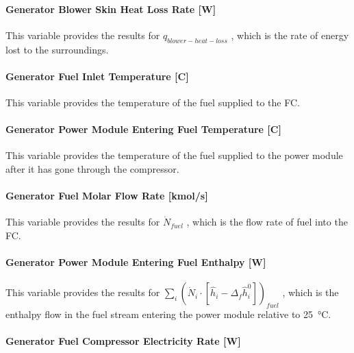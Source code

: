 \paragraph{Generator Blower Skin Heat Loss Rate {[}W{]}}\label{generator-blower-skin-heat-loss-rate-w}

This variable provides the results for \({q_{blower - heat - loss}}\) , which is the rate of energy lost to the surroundings.

\paragraph{Generator Fuel Inlet Temperature {[}C{]}}\label{generator-fuel-inlet-temperature-c}

This variable provides the temperature of the fuel supplied to the FC.

\paragraph{Generator Power Module Entering Fuel Temperature {[}C{]}}\label{generator-power-module-entering-fuel-temperature-c}

This variable provides the temperature of the fuel supplied to the power module after it has gone through the compressor.

\paragraph{Generator Fuel Molar Flow Rate {[}kmol/s{]}}\label{generator-fuel-molar-flow-rate-kmols-1}

This variable provides the results for \({\dot N_{fuel}}\) , which is the flow rate of fuel into the FC.

\paragraph{Generator Power Module Entering Fuel Enthalpy {[}W{]}}\label{generator-power-module-entering-fuel-enthalpy-w}

This variable provides the results for \({\sum\limits_i {\left( {{{\dot N}_i} \cdot \left[ {{{\hat h}_i} - {\Delta_f}\hat h_i^0} \right]} \right)}_{fuel}}\) , which is the enthalpy flow in the fuel stream entering the power module relative to \SI{25}{\celsius}.

\paragraph{Generator Fuel Compressor Electricity Rate {[}W{]}}\label{generator-fuel-compressor-electric-power-w}

